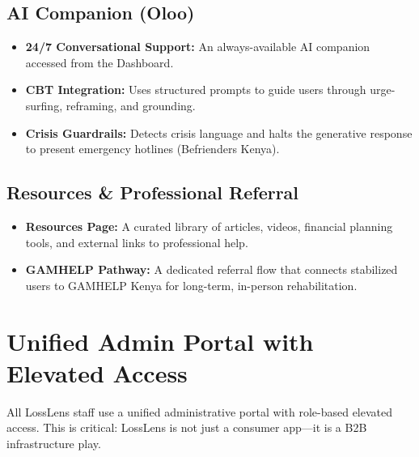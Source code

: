 \documentclass[11pt,a4paper]{article}
\begin{document}
\subsection{AI Companion (Oloo)}
\begin{itemize}
    \item \textbf{24/7 Conversational Support:} An always-available AI companion accessed from the Dashboard.
    \item \textbf{CBT Integration:} Uses structured prompts to guide users through urge-surfing, reframing, and grounding.
    \item \textbf{Crisis Guardrails:} Detects crisis language and halts the generative response to present emergency hotlines (Befrienders Kenya).
\end{itemize}

\subsection{Resources \& Professional Referral}
\begin{itemize}
    \item \textbf{Resources Page:} A curated library of articles, videos, financial planning tools, and external links to professional help.
    \item \textbf{GAMHELP Pathway:} A dedicated referral flow that connects stabilized users to GAMHELP Kenya for long-term, in-person rehabilitation.
\end{itemize}

\section{Unified Admin Portal with Elevated Access}
All LossLens staff use a unified administrative portal with role-based elevated access. This is critical: LossLens is not just a consumer app—it is a B2B infrastructure play.
\end{document}
